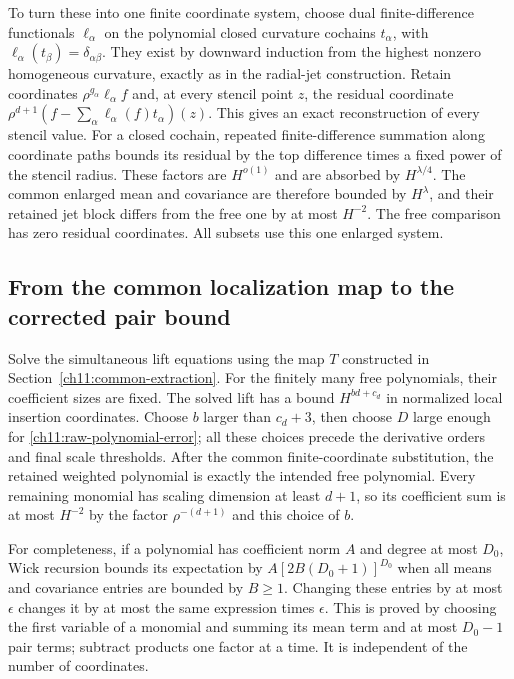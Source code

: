 To turn these into one finite coordinate system, choose dual
finite-difference functionals $\ell_\alpha$ on the polynomial
closed curvature cochains $t_\alpha$, with
$\ell_\alpha(t_\beta)=\delta_{\alpha\beta}$.
They exist by downward induction from the highest nonzero homogeneous
curvature, exactly as in the radial-jet construction.
Retain coordinates $\rho^{g_\alpha}\ell_\alpha f$ and,
at every stencil point $z$, the residual coordinate
$\rho^{d+1}(f-\sum_\alpha\ell_\alpha(f)t_\alpha)(z)$.
This gives an exact reconstruction of every stencil value.
For a closed cochain, repeated finite-difference summation along
coordinate paths bounds its residual by the top difference times
a fixed power of the stencil radius.
These factors are $H^{o(1)}$ and are absorbed by $H^{\lambda/4}$.
The common enlarged mean and covariance are therefore bounded by
$H^\lambda$, and their retained jet block differs from the free
one by at most $H^{-2}$. The free comparison has zero residual
coordinates. All subsets use this one enlarged system.

\subsection{From the common localization map to the corrected pair bound}
\label{ch11:corrected-pair-comparison}

Solve the simultaneous lift equations using the map $T$
constructed in Section~\ref{ch11:common-extraction}.
For the finitely many free polynomials, their coefficient sizes
are fixed. The solved lift has a bound $H^{bd+c_d}$ in normalized local insertion
coordinates. Choose $b$ larger than $c_d+3$, then choose $D$
large enough for \eqref{ch11:raw-polynomial-error}; all these
choices precede the derivative orders and final scale thresholds.
After the common finite-coordinate substitution, the retained
weighted polynomial is exactly the intended free polynomial.
Every remaining monomial has scaling dimension at least $d+1$, so its
coefficient sum is at most $H^{-2}$ by the factor
$\rho^{-(d+1)}$ and this choice of $b$.

For completeness, if a polynomial has coefficient norm $A$ and
degree at most $D_0$, Wick recursion bounds its expectation by
$A[2B(D_0+1)]^{D_0}$ when all means and covariance entries are
bounded by $B\ge1$. Changing these entries by at most $\epsilon$
changes it by at most the same expression times $\epsilon$.
This is proved by choosing the first variable of a monomial
and summing its mean term and at most $D_0-1$ pair terms;
subtract products one factor at a time.
It is independent of the number of coordinates.

